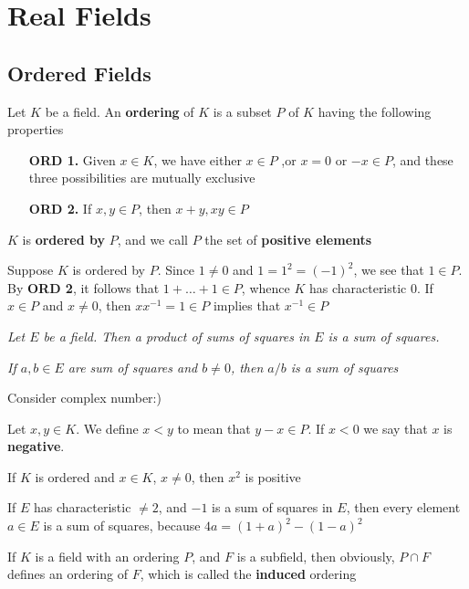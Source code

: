 \documentclass[11pt]{article}
\begin{document}
\section{Real Fields}
\label{sec:org048cf5f}
\subsection{Ordered Fields}
\label{sec:orgaf9d4e6}
Let \(K\) be a field. An \textbf{ordering} of \(K\) is a subset \(P\) of \(K\)
having the following properties
\bigskip
\begin{itemize}[itemindent=3em]
\item[\textbf{ORD 1.}] Given \(x\in K\), we have either \(x\in P\) ,or \(x=0\) or
\(-x\in P\), and these three possibilities are mutually exclusive
\item[\textbf{ORD 2.}] If \(x,y\in P\), then \(x+y,xy\in P\)
\end{itemize}

\(K\) is \textbf{ordered by} \(P\), and we call \(P\) the set of \textbf{positive
elements}

Suppose \(K\) is ordered by \(P\). Since \(1\neq0\) and \(1=1^2=(-1)^2\), we
see that \(1\in P\). By \textbf{ORD 2}, it follows that \(1+\dots+1\in P\), whence \(K\)
has characteristic 0. If \(x\in P\) and \(x\neq0\), then \(xx^{-1}=1\in P\) implies
that \(x^{-1}\in P\)

\begin{center}
\emph{Let \(E\) be a field. Then a product of sums of squares in \(E\) is a sum
of squares.}

\emph{If \(a,b\in E\) are sum of squares and \(b\neq0\), then \(a/b\) is a sum of
squares}
\end{center}

Consider complex number:)

Let \(x,y\in K\). We define \(x<y\) to mean that \(y-x\in P\). If \(x<0\) we say
that \(x\) is \textbf{negative}.

If \(K\) is ordered and \(x\in K\), \(x\neq0\), then \(x^2\) is positive

If \(E\) has characteristic \(\neq2\), and \(-1\) is a sum of squares in \(E\),
then every element \(a\in E\) is a sum of squares, because
\(4a=(1+a)^2-(1-a)^2\)

If \(K\) is a field with an ordering \(P\), and \(F\) is a subfield, then
obviously, \(P\cap F\) defines an ordering of \(F\), which is called the
\textbf{induced} ordering
\end{document}
